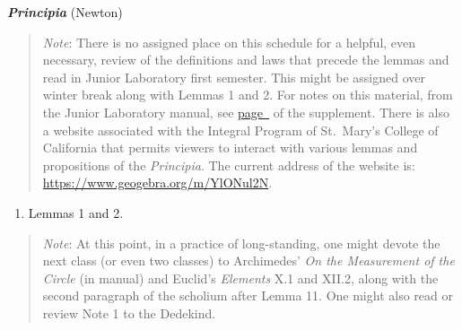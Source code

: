 \documentclass[10pt]{article}
\begin{document}
\textbf{\emph{Principia}} (Newton)
\label{NewtonStart}
\vspace{-0.5em}
\begin{quote}
{\small\emph{Note}: There is no assigned place on this
	schedule for a helpful, even necessary, review of
	the definitions and laws that precede the lemmas and
	read in Junior Laboratory first semester. This might
	be assigned over winter break along with Lemmas 1
	and 2. For notes on this material, from the Junior
	Laboratory manual, see
	\hyperref[supple.64]{page~\pageref{supple.64}} of
	the supplement. There is also a website associated
	with the Integral Program of St.\ Mary's College of
	California that permits viewers to interact with
	various lemmas and propositions of the \emph{Principia}.
	The current address of the website is: \href{https://www.geogebra.org/m/YlONul2N}{https://www.geogebra.org/m/YlONul2N}.
	
	}
\end{quote}
\begin{enumerate}[noitemsep] \item
		Lemmas 1 and 2.  \end{enumerate}
		\vspace{-0.5em}
\begin{quote} {\small \emph{Note}: At this point, in a
		practice of long-standing, one might devote
		the next class (or even two classes) to
		Archimedes' \emph{On the Measurement of the
			Circle} (in manual) and Euclid's
		\emph{Elements} X.1 and XII.2, along with
		the second paragraph of the scholium after
		Lemma 11. One might also read or review Note
		1 to the Dedekind.  \label{Dedekind}
		
		}
\end{quote}
\end{document}
